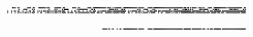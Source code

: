 \documentclass[10pt]{article}
\theoremstyle{plain}
\theoremstyle{definition}
\begin{document}
\begin{table*}[b]
{\begin{minipage}{5.32in}
\[\begin{array}{@{}r@{}}
\begin{array}{@{}l@{}}
\a\a\a\a\a\a\a\a\b\b\b\b\a\a\b\b\a\a\a\a\a\a\a\a\b\b\b\b\a\a\b\b\a\a\a\a \b\b\b\b\b\b\b\b\a\b\b\b\a\a\a\a\a\b\b\b\b\b\b\b\a\a\b\b\a\a\a\a\a\a\a\a \b\b\b\b\a\a\b\b\a\a\a\a\a\a\a\a\b\b\b\b\a\a\b\b\b\b\b\b\b\b\b\b\b\b\b\b \a\b\b\b\b\a\a\b\a\b\b\b\b\b\b\b\a\a\b\b\b\b\b\b\b\b\b\b\b\b\b\b\b\a\b\b \b\b\b\b\a\a\a\a\b\b\b\b\b\a\b\b\b\b\b\b\b\b\b\b\b\b\b\b\b\b\b\b\b\b\b\b \b\b\b\b\b\b\b\b\b\a\b\b\b\a\b\b\a\b\a\b\b\b\b\b\a\a\b\b\b\a\b\b\a\a\a\a \b\b\b\b\a\a\b\b\b\b\b\b\b\b\b\b\b\b\b\b\a\b\b\b\b\b\b\b\b\b\b\b\b\b\b\b \a\a\b\b\mynl
\a\a\a\a\a\a\a\a\a\a\a\a\a\a\a\b\a\a\a\a\b\b\b\b\a\a\a\a\a\b\a\b\a\a\a\a \a\a\a\a\a\a\a\a\a\a\a\b\a\a\a\a\a\b\a\b\a\a\a\a\a\b\a\b\b\b\b\b\a\a\a\a \a\a\a\a\a\b\a\b\b\b\b\b\b\b\b\b\a\a\a\a\b\b\a\b\a\a\a\a\a\a\a\a\a\a\a\a \a\a\a\b\b\b\b\b\a\b\a\b\a\a\a\a\b\b\a\b\a\a\a\a\a\a\a\a\a\a\a\a\a\b\a\b \a\a\a\a\b\b\b\b\a\a\a\a\a\b\a\b\a\a\a\a\a\a\a\a\a\a\a\a\a\a\a\b\a\a\a\a \b\b\a\b\a\a\a\a\a\b\a\b\b\b\a\b\a\b\a\b\a\a\a\a\a\a\a\b\b\b\a\b\b\b\b\b \a\a\a\a\a\b\a\b\b\b\a\b\a\a\a\a\a\a\a\a\a\a\a\b\b\b\a\b\b\b\a\b\a\a\a\a \a\b\a\b\mynl
\a\a\a\b\a\a\a\b\a\a\b\b\a\a\b\b\a\a\a\b\a\a\a\b\a\a\b\b\a\a\b\b\a\a\a\b \a\b\a\b\a\b\b\b\a\b\b\b\a\b\a\b\a\b\b\b\a\b\b\b\a\b\b\b\a\a\a\b\a\a\a\b \a\a\b\b\a\a\b\b\a\a\a\b\a\a\a\b\a\a\b\b\a\a\b\b\b\a\a\b\a\b\a\b\b\b\b\b \a\b\b\b\b\b\a\b\b\b\b\b\b\b\b\b\b\b\b\b\b\a\a\b\a\b\a\b\b\b\b\b\b\a\b\b \b\a\a\b\a\a\a\b\b\a\b\b\b\a\b\b\b\b\a\b\b\b\a\b\b\b\b\b\b\b\b\b\b\b\a\b \b\b\b\b\b\b\b\b\b\b\b\b\b\b\b\b\b\b\a\b\b\b\b\b\b\b\b\b\b\a\b\b\b\a\a\b \b\a\b\b\b\a\b\b\b\b\b\b\b\b\a\b\b\b\b\b\b\b\b\b\b\b\b\b\b\b\b\b\b\b\b\b \b\b\b\b\mynl
\a\a\a\b\a\a\a\b\a\a\a\b\a\a\b\b\a\b\a\b\a\b\b\b\a\b\a\b\a\b\b\b\a\a\a\b \a\a\b\b\a\a\a\b\a\b\b\b\a\b\a\b\a\b\b\b\a\b\a\b\a\b\b\b\b\a\a\b\b\a\b\b \b\a\a\b\b\a\b\b\b\b\b\b\b\b\b\b\b\b\a\b\b\b\b\b\a\a\b\b\b\a\b\b\a\a\a\b \b\b\b\b\b\b\a\b\b\b\b\b\b\b\a\b\b\b\b\b\a\a\a\b\b\a\a\b\a\a\a\b\b\a\b\b \a\b\a\b\b\b\b\b\a\b\a\b\b\b\b\b\a\a\a\b\a\a\b\b\a\a\a\b\b\b\b\b\a\b\a\b \a\b\b\b\a\b\a\b\b\b\b\b\b\b\b\b\b\b\b\b\b\b\a\b\b\b\b\b\b\b\b\b\b\b\b\b \b\b\a\b\b\b\b\b\b\a\b\b\b\a\b\b\b\a\a\b\b\b\b\b\b\b\b\b\b\b\b\b\b\b\a\b \b\b\b\b
\end{array}
\mynnl
\begin{array}{@{}l@{}}
\a\a\a\a\a\a\a\a\a\a\a\a\a\a\a\a\a\a\a\a\a\a\a\a\a\a\a\a\a\a\a\a\a\a\a\a \a\a\a\a\a\a\a\a\a\a\a\a\a\a\a\a\a\a\a\a\a\a\a\a\a\a\a\a\a\a\a\a\a\a\a\a \a\a\a\a\a\a\a\a\a\a\a\a\a\a\a\a\a\a\a\a\a\a\a\a\a\a\a\a\a\a\a\a\b\b\b\b \b\a\b\b\a\a\b\b\a\a\a\b\a\a\b\b\a\a\b\b\b\b\b\b\b\b\b\b\b\b\b\b\b\a\b\b \b\b\b\b\a\a\a\a\b\b\b\b\b\a\b\b\b\b\b\b\b\b\b\b\b\b\b\b\b\b\b\b\b\b\b\b \b\b\b\b\b\b\b\b\b\a\b\b\b\b\b\b\b\b\a\b\b\b\b\b\b\b\b\b\b\a\b\b\b\a\a\b \b\a\b\b\b\a\b\b\b\b\b\b\b\b\a\b\b\b\b\b\b\b\b\b\b\b\b\b\b\b\b\b\b\b\b\b \b\b\b\b\mynl

\end{array}
\end{array}\]
\end{minipage}}
\end{table*}
\end{document}
